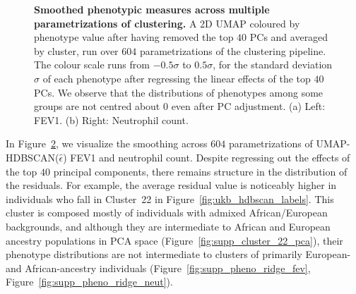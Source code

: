 \begin{figure}[!ht]
\begin{subfigure}[b]{0.45\linewidth}
    \caption{}
      \label{fig:smoothed_neutrophil}
  \end{subfigure}
  \caption[Smoothed phenotypic measures across multiple parametrizations of clustering]{\textbf{Smoothed phenotypic measures across multiple parametrizations of clustering.} A 2D UMAP coloured by phenotype value after having removed the top $40$ PCs and averaged by cluster, run over $604$ parametrizations of the clustering pipeline. The colour scale runs from $-0.5\sigma$ to $0.5\sigma$, for the standard deviation $\sigma$ of each phenotype after regressing the linear effects of the top $40$ PCs. We observe that the distributions of phenotypes among some groups are not centred about $0$ even after PC adjustment. (a) Left: FEV1. (b) Right:  Neutrophil count.}
\label{fig:smoothed_phenos}
\end{figure}

\clearpage

In Figure~\ref{fig:smoothed_phenos}, we visualize the smoothing across $604$ parametrizations of UMAP-HDBSCAN($\hat{\epsilon}$) FEV1 and neutrophil count. Despite regressing out the effects of the top $40$ principal components, there remains structure in the distribution of the residuals. For example, the average residual value is noticeably higher in individuals who fall in Cluster~22 in Figure~\ref{fig:ukb_hdbscan_labels}. This cluster is composed mostly of individuals with admixed African/European backgrounds, and although they are intermediate to African and European ancestry populations in PCA space (Figure~\ref{fig:supp_cluster_22_pca}), their phenotype distributions are not intermediate to clusters of primarily European- and African-ancestry individuals (Figure~\ref{fig:supp_pheno_ridge_fev}, Figure~\ref{fig:supp_pheno_ridge_neut}).

\clearpage

